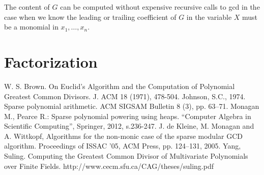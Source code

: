 \documentclass[12pt,reqno]{amsart}
\numberwithin{equation}{section}
\begin{document}
The content of $G$ can be computed without expensive recursive calls to gcd in the case when we know the leading or trailing coefficient of $G$ in the variable $X$ must be a monomial in $x_1,\dots,x_n$.

\section{Factorization}

\begin{thebibliography}{99}
 W. S. Brown. On Euclid’s Algorithm and the
Computation of Polynomial Greatest Common Divisors.
J. ACM 18 (1971), 478-504.
 Johnson, S.C., 1974. Sparse polynomial arithmetic. ACM SIGSAM Bulletin 8 (3), pp. 63--71.
 Monagan M., Pearce R.: Sparse polynomial powering using heaps. “Computer Algebra in Scientific Computing”, Springer, 2012, s.236-247. 
  J. de Kleine, M. Monagan and A. Wittkopf, Algorithms for the non-monic case of the sparse
modular GCD algorithm. Proceedings of ISSAC ’05,
ACM Press, pp. 124--131, 2005.
 Yang, Suling. Computing the Greatest Common Divisor of Multivariate Polynomials over Finite Fields. http://www.cecm.sfu.ca/CAG/theses/suling.pdf
\end{thebibliography}
\end{document}
